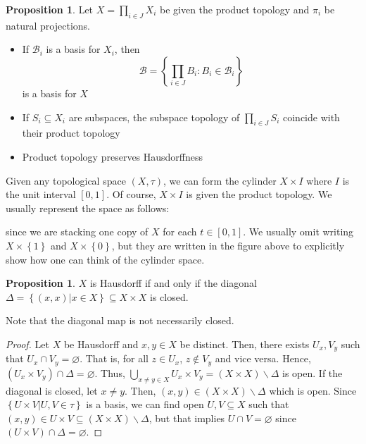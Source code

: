 \documentclass[12pt,reqno]{amsart}
\numberwithin{theorem}{section}
\theoremstyle{definition}
\theoremstyle{remark}
\numberwithin{equation}{section}
\newcommand{\cB}{\mathcal{B}}
\newcommand{\set}[1]{\left \{ #1 \right \}}
\theoremstyle{definition}
\newtheorem{prop}[theorem]{Proposition}
\begin{document}
\begin{prop}
    Let $X=\prod_{i \in J} X_i$ be given the product topology and $\pi_i$ be natural projections.
    \begin{itemize}
        \item If $\cB_i$ is a basis for $X_i$, then 
        $$\cB = \set{\prod_{i \in J}B_i:B_i \in \cB_i}$$
        is a basis for $X$
        \item If $S_i\subseteq X_i$ are subspaces, the subspace topology of $\prod_{i\in J}S_i$ coincide with their product topology
        \item Product topology preserves Hausdorffness
    \end{itemize}
\end{prop}
\begin{example}
    Given any topological space $(X,\tau)$, we can form the cylinder $X\times I$ where $I$ is the unit interval $[0,1]$. Of course, $X\times I$ is given the product topology. We usually represent the space as follows:
    \begin{center}
    \end{center}
    since we are stacking one copy of $X$ for each $t \in [0,1]$. We usually omit writing $X\times \set{1}$ and $X\times \set{0}$, but they are written in the figure above to explicitly show how one can think of the cylinder space.
\end{example}
\begin{prop}
    $X$ is Hausdorff if and only if the diagonal $\Delta = \set{(x,x)| x\in X} \subseteq X\times X$ is closed.
\end{prop}
Note that the diagonal map is not necessarily closed. 
\begin{proof}
    Let $X$ be Hausdorff and $x,y \in X$ be distinct. Then, there exists $U_x,V_y$ such that $U_x \cap V_y = \varnothing$. That is, for all $z \in U_x$, $z \notin V_y$ and vice versa. Hence, $(U_x \times V_y)\cap \Delta = \varnothing$. Thus, $\bigcup_{x\neq y \in X}U_x \times V_y = (X\times X )\backslash \Delta$ is open. If the diagonal is closed, let $x \neq y$. Then, $(x,y) \in (X\times X) \backslash \Delta$ which is open. Since $\set{U\times V |U,V\in \tau}$ is a basis, we can find open $U,V\subseteq X$ such that $(x,y) \in U\times V \subseteq (X\times X) \backslash \Delta$, but that implies $U\cap V = \varnothing$ since $(U\times V )\cap \Delta = \varnothing$.
\end{proof}
\end{document}
